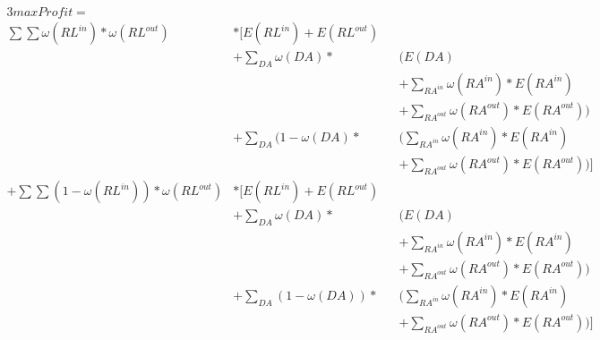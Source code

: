 \begin{alignat*}{3}
	max Profit =                                                                                                                                               \\
	\sum \sum \omega(RL^{in})* \omega(RL^{out})       & * \Biggl[E(RL^{in}) + E(RL^{out})                                                                      \\
	                                                  & +\sum_{DA} \omega(DA) *           &  & \Biggl(E(DA)                                                    \\
	                                                  &                                   &  & + \sum_{RA^{in}} \omega(RA^{in}) * E(RA^{in})                   \\
	                                                  &                                   &  & + \sum_{RA^{out}} \omega(RA^{out}) * E(RA^{out})\Biggr)         \\
	                                                  & +\sum_{DA} (1- \omega(DA) *       &  & \Biggl(\sum_{RA^{in}} \omega(RA^{in}) * E(RA^{in})              \\
	                                                  &                                   &  & + \sum_{RA^{out}} \omega(RA^{out}) * E(RA^{out})\Biggr) \Biggr] \\
	+\sum \sum (1-\omega(RL^{in})) * \omega(RL^{out}) & * \Biggl[E(RL^{in}) + E(RL^{out})                                                                      \\
	                                                  & +\sum_{DA} \omega(DA) *           &  & \Biggl(E(DA)                                                    \\
	                                                  &                                   &  & + \sum_{RA^{in}} \omega(RA^{in}) * E(RA^{in})                   \\
	                                                  &                                   &  & + \sum_{RA^{out}} \omega(RA^{out}) * E(RA^{out})\Biggr)         \\
	                                                  & +\sum_{DA} (1- \omega(DA)) *      &  & \Biggl(\sum_{RA^{in}} \omega(RA^{in}) * E(RA^{in})              \\
	                                                  &                                   &  & + \sum_{RA^{out}} \omega(RA^{out}) * E(RA^{out})\Biggr) \Biggr] \\
\end{alignat*}
